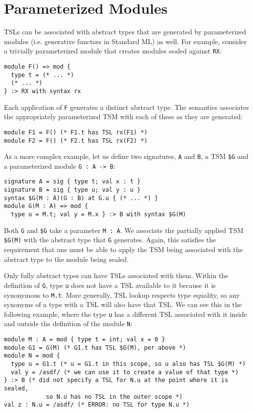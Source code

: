 \section{Parameterized Modules}
TSLs can be associated with abstract types that are generated by parameterized modules (i.e. generative functors in Standard ML) as well. For example, consider a trivially parameterized module that creates modules sealed against \lstinline{RX}:
\begin{lstlisting}[numbers=none]
module F() => mod {
  type t = (* ... *)
  (* ... *)
} :> RX with syntax rx 
\end{lstlisting}
Each application of \lstinline{F} generates a distinct abstract type. The semantics associates the appropriately parameterized TSM with each of these as they are generated:
\begin{lstlisting}[numbers=none]
module F1 = F() (* F1.t has TSL rx(F1) *)
module F2 = F() (* F2.t has TSL rx(F2) *)
\end{lstlisting}

As a more complex example, let us define two signatures, \lstinline{A} and \lstinline{B}, a TSM \texttt{\$G} and a parameterized module \lstinline{G : A -> B}:
\begin{lstlisting}[numbers=none,mathescape=|]
signature A = sig { type t; val x : t }
signature B = sig { type u; val y : u }
syntax $G(M : A)(G : B) at G.u { (* ... *) }
module G(M : A) => mod { 
  type u = M.t; val y = M.x } :> B with syntax $G(M)
\end{lstlisting}
Both \lstinline{G} and \texttt{\$G} take a parameter \lstinline{M : A}. We associate the partially applied TSM \texttt{\$G(M)} with the abstract type that \lstinline{G} generates. Again, this satisfies the requirement that one must be able to apply the TSM being associated with the abstract type to the module being sealed. 

Only fully abstract types can have TSLs associated with them. Within the definition of \lstinline{G}, type \lstinline{u} does not have a TSL available to it because it is synonymous to \lstinline{M.t}. More generally, TSL lookup respects type equality, so any synonyms of a type with a TSL will also have that TSL. We can see this in the following example, where the type \lstinline{u} has a different TSL associated with it inside and outside the definition of the module \lstinline{N}:
\begin{lstlisting}[numbers=none,mathescape=|]
module M : A = mod { type t = int; val x = 0 }
module G1 = G(M) (* G1.t has TSL $G(M), per above *)
module N = mod { 
  type u = G1.t (* u = G1.t in this scope, so u also has TSL $G(M) *)
  val y = /asdf/ (* we can use it to create a value of that type *) 
} :> B (* did not specify a TSL for N.u at the point where it is sealed, 
            so N.u has no TSL in the outer scope *)
val z : N.u = /asdf/ (* ERROR: no TSL for type N.u *)
\end{lstlisting}

